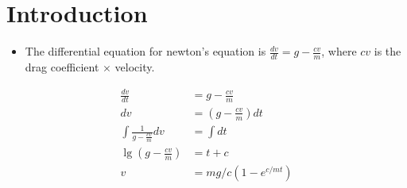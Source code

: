 \documentclass[12pt]{article}
\begin{document}
\section{Introduction}

\begin{itemize}
    \item The differential equation for newton's equation is $\frac{dv}{dt} = g - \frac{cv}{m}$, where $cv$ is the drag coefficient $\times$ velocity.
\end{itemize}

\begin{align}
    \frac{dv}{dt} &= g - \frac{cv}{m} \\
    dv &= (g - \frac{cv}{m}) dt \\
    \int \frac{1}{g - \frac{cv}{m}} dv &= \int dt \\
    \lg (g - \frac{cv}{m}) &= t + c \\
    v &= mg/c(1- e ^{c/mt})
\end{align}
\end{document}
